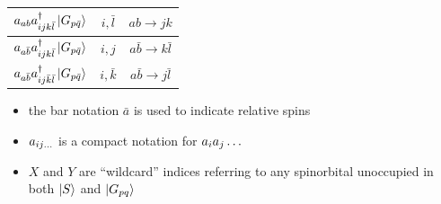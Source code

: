 \documentclass[./thesis.tex]{subfiles}
\begin{document}
\begin{table}
\begin{center}
\begin{minipage}[l]{0.6\textwidth}
\begin{tabular}{ c|c|c }
                \hline \rule{0pt}{3ex}
                $a_{ab} a^\dagger_{ijk \bar l} \ket {G_{p \bar q}}$                       &$i,\bar l$             &$ab \rightarrow jk$            \\
                \hline \rule{0pt}{3ex}
                $a_{a  \bar b} a^\dagger_{ijk \bar l} \ket {G_{p \bar q}}$                        &$i,j$          &$a \bar b \rightarrow k \bar l$                \\
                \hline \rule{0pt}{3ex}
                $a_{a  \bar b} a^\dagger_{ij \bar k \bar l} \ket {G_{p \bar q}}$                  &$i,\bar k$             &$a \bar b \rightarrow j \bar l$                \\
        \end{tabular} 
\end{minipage}
\begin{minipage}[r]{0.3\textwidth}
\begin{itemize}
\item
the bar notation $\bar a$ is used to indicate relative spins
\item
$a_{ij\ldots}$ is a compact notation for $a_{i} a_{j} \ldots$
\item
$X$ and $Y$ are ``wildcard'' indices referring to any spinorbital unoccupied in both $\ket S$ and $\ket {G_{pq}}$ 
\end{itemize}
\end{minipage}
\end{center}
\end{table}
\end{document}
